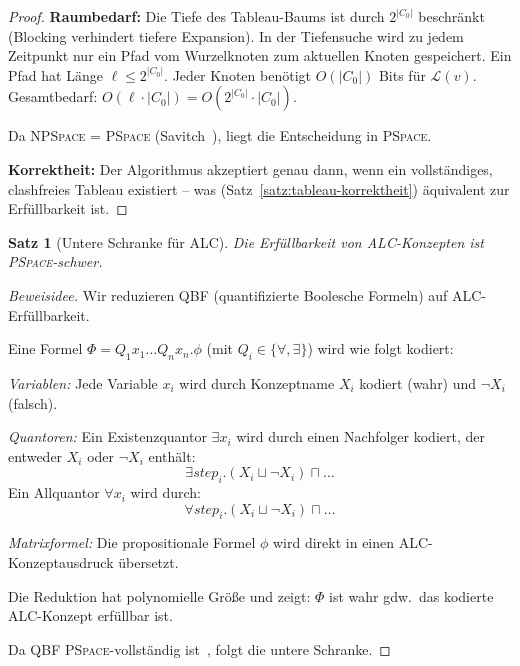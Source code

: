 ﻿\documentclass[a4paper,12pt]{article}
\theoremstyle{definition}
\theoremstyle{plain}
\newtheorem{satz}{Satz}[section]
\theoremstyle{remark}
\begin{document}
\begin{proof}
\textbf{Raumbedarf:}
Die Tiefe des Tableau-Baums ist durch $2^{|C_0|}$ beschr{\"{a}}nkt
(Blocking verhindert tiefere Expansion).
In der Tiefensuche wird zu jedem Zeitpunkt nur ein Pfad
vom Wurzelknoten zum aktuellen Knoten gespeichert.
Ein Pfad hat L{\"{a}}nge $\ell \leq 2^{|C_0|}$.
Jeder Knoten ben{\"{o}}tigt $O(|C_0|)$ Bits f{\"{u}}r $\mathcal{L}(v)$.
Gesamtbedarf: $O(\ell \cdot |C_0|) = O(2^{|C_0|} \cdot |C_0|)$.

Da \textsc{NPSpace} = \textsc{PSpace} (Savitch~\cite{Savitch1970}),
liegt die Entscheidung in \textsc{PSpace}.

\textbf{Korrektheit:}
Der Algorithmus akzeptiert genau dann, wenn ein
vollst{\"{a}}ndiges, clashfreies Tableau existiert --
was (Satz~\ref{satz:tableau-korrektheit})
{\"{a}}quivalent zur Erf{\"{u}}llbarkeit ist.
\qedhere
\end{proof}

\begin{satz}[Untere Schranke f{\"{u}}r ALC]
\label{satz:alc-pspace-lower}
Die Erf{\"{u}}llbarkeit von \textsf{ALC}-Konzepten ist
\textsc{PSpace}-schwer.
\end{satz}

\begin{proof}[Beweisidee]
Wir reduzieren \textsc{QBF} (quantifizierte Boolesche Formeln)
auf \textsf{ALC}-Erf{\"{u}}llbarkeit.

Eine Formel $\Phi = Q_1 x_1 \ldots Q_n x_n.\phi$
(mit $Q_i \in \{\forall, \exists\}$) wird wie folgt kodiert:

\textit{Variablen:} Jede Variable $x_i$ wird durch Konzeptname
$X_i$ kodiert (wahr) und $\neg X_i$ (falsch).

\textit{Quantoren:} Ein Existenzquantor $\exists x_i$
wird durch einen Nachfolger kodiert, der entweder
$X_i$ oder $\neg X_i$ enth{\"{a}}lt:
\[
  \exists\mathit{step}_i.(X_i \sqcup \neg X_i) \sqcap \ldots
\]
Ein Allquantor $\forall x_i$ wird durch:
\[
  \forall\mathit{step}_i.(X_i \sqcup \neg X_i) \sqcap \ldots
\]

\textit{Matrixformel:} Die propositionale Formel $\phi$
wird direkt in einen \textsf{ALC}-Konzeptausdruck {\"{u}}bersetzt.

Die Reduktion hat polynomielle Gr{\"{o}}{\ss}e und zeigt:
$\Phi$ ist wahr gdw.\ das kodierte \textsf{ALC}-Konzept
erf{\"{u}}llbar ist.

Da \textsc{QBF} \textsc{PSpace}-vollst{\"{a}}ndig ist~\cite{Stockmeyer1976},
folgt die untere Schranke.
\qedhere
\end{proof}
\end{document}
